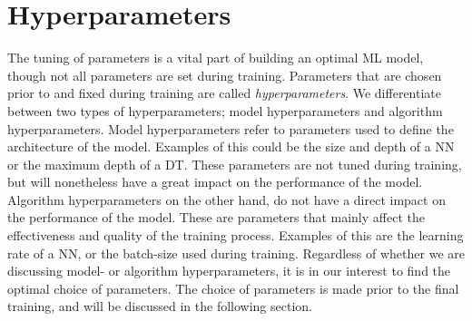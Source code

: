 \section{Hyperparameters}
The tuning of parameters is a vital part of building an optimal \ac{ML}
model, though not all parameters are set during training. Parameters 
that are chosen prior to and fixed during training are called \emph{hyperparameters}. We differentiate
between two types of hyperparameters; model hyperparameters and algorithm 
hyperparameters. Model hyperparameters refer to parameters used to define the 
architecture of the model. Examples of this could be the size and depth of 
a \ac{NN} or the maximum depth of a \ac{DT}. These parameters are not tuned
during training, but will nonetheless have a great impact on the performance 
of the model. Algorithm hyperparameters on the other hand, do not have a direct impact 
on the performance of the model. These are parameters that mainly affect the 
effectiveness and quality of the training process. Examples of this are the 
learning rate of a \ac{NN}, or the batch-size used during training. Regardless 
of whether we are discussing model- or algorithm hyperparameters, it is in our interest
to find the optimal choice of parameters. The choice of parameters is made 
prior to the final training, and will be discussed in the following section.